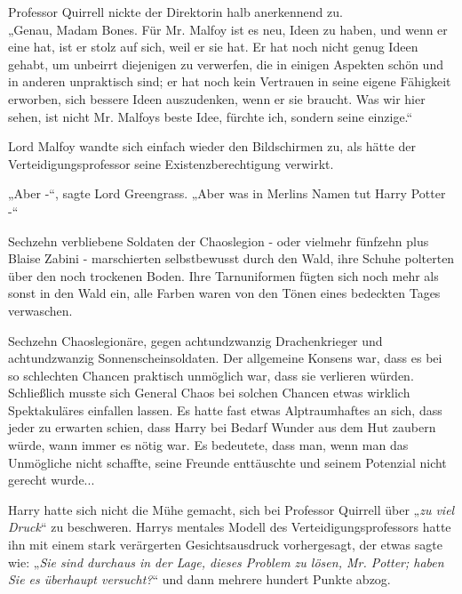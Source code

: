{Professor Quirrell nickte der Direktorin halb anerkennend zu.\\ „Genau, Madam Bones. Für Mr. Malfoy ist es neu, Ideen zu haben, und wenn er eine hat, ist er stolz auf sich, weil er sie hat. Er hat noch nicht genug Ideen gehabt, um unbeirrt diejenigen zu verwerfen, die in einigen Aspekten schön und in anderen unpraktisch sind; er hat noch kein Vertrauen in seine eigene Fähigkeit erworben, sich bessere Ideen auszudenken, wenn er sie braucht. Was wir hier sehen, ist nicht Mr. Malfoys beste Idee, fürchte ich, sondern seine einzige.“

Lord Malfoy wandte sich einfach wieder den Bildschirmen zu, als hätte der Verteidigungsprofessor seine Existenzberechtigung verwirkt.

„Aber -“, sagte Lord Greengrass. „Aber was in Merlins Namen tut Harry Potter -“

Sechzehn verbliebene Soldaten der Chaoslegion - oder vielmehr fünfzehn plus Blaise Zabini - marschierten selbstbewusst durch den Wald, ihre Schuhe polterten über den noch trockenen Boden. Ihre Tarnuniformen fügten sich noch mehr als sonst in den Wald ein, alle Farben waren von den Tönen eines bedeckten Tages verwaschen.

Sechzehn Chaoslegionäre, gegen achtundzwanzig Drachenkrieger und achtundzwanzig Sonnenscheinsoldaten. Der allgemeine Konsens war, dass es bei so schlechten Chancen praktisch unmöglich war, dass sie verlieren würden. Schließlich musste sich General Chaos bei solchen Chancen etwas wirklich Spektakuläres einfallen lassen. Es hatte fast etwas Alptraumhaftes an sich, dass jeder zu erwarten schien, dass Harry bei Bedarf Wunder aus dem Hut zaubern würde, wann immer es nötig war. Es bedeutete, dass man, wenn man das Unmögliche nicht schaffte, seine Freunde enttäuschte und seinem Potenzial nicht gerecht wurde...

Harry hatte sich nicht die Mühe gemacht, sich bei Professor Quirrell über „\emph{zu viel Druck}“ zu beschweren. Harrys mentales Modell des Verteidigungsprofessors hatte ihn mit einem stark verärgerten Gesichtsausdruck vorhergesagt, der etwas sagte wie: „\emph{Sie sind durchaus in der Lage, dieses Problem zu lösen, Mr. Potter; haben Sie es überhaupt versucht?}“ und dann mehrere hundert Punkte abzog.

}
